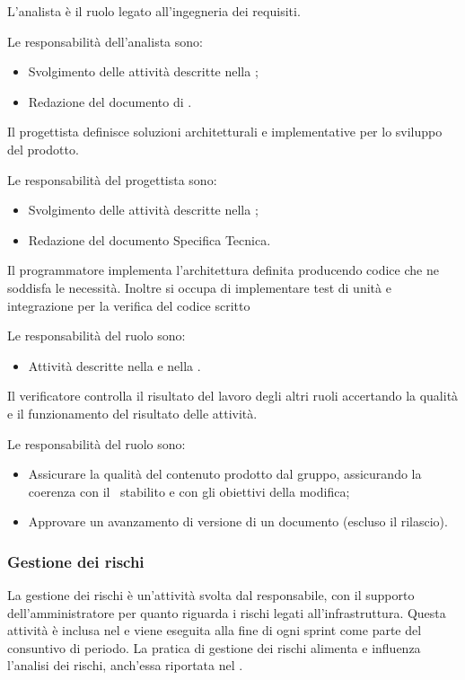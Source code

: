 \par L'analista è il ruolo legato all'ingegneria dei requisiti.
\par Le responsabilità dell'analista sono:
\begin{itemize}
  \item Svolgimento delle attività descritte nella ;
  \item Redazione del documento di \AdR.
\end{itemize}

\par Il progettista definisce soluzioni architetturali e implementative per lo sviluppo del prodotto.
\par Le responsabilità del progettista sono:
\begin{itemize}
  \item Svolgimento delle attività descritte nella ;
  \item Redazione del documento Specifica Tecnica.
\end{itemize}

\par Il programmatore implementa l'architettura definita producendo codice che ne soddisfa le necessità. Inoltre si occupa di implementare test di unità e integrazione per la verifica del codice scritto
\par Le responsabilità del ruolo sono:
\begin{itemize}
  \item Attività descritte nella  e nella .
\end{itemize}

\par Il verificatore controlla il risultato del lavoro degli altri ruoli accertando la qualità e il funzionamento del risultato delle attività.
\par Le responsabilità del ruolo sono:
\begin{itemize}
  \item Assicurare la qualità del contenuto prodotto dal gruppo, assicurando la coerenza con il \WoW\ stabilito e con gli obiettivi della modifica;
  \item Approvare un avanzamento di versione di un documento (escluso il rilascio).
\end{itemize}

\subsubsection{Gestione dei rischi}
\par La gestione dei rischi è un’attività svolta dal responsabile, con il supporto dell’amministratore per quanto riguarda i rischi legati all’infrastruttura. Questa attività è inclusa nel \PianoDiProgetto e viene eseguita alla fine di ogni sprint come parte del consuntivo di periodo. La pratica di gestione dei rischi alimenta e influenza l’analisi dei rischi, anch’essa riportata nel \PianoDiProgetto.


